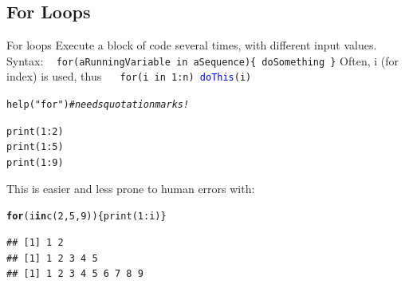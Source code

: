 \documentclass[xcolor=table,       handout,    xcolor=dvipsnames]{beamer}\usepackage[]{graphicx}\usepackage[]{color}
\makeatletter
\newcommand{\hlnum}[1]{\textcolor[rgb]{0,0,0}{#1}}
\newcommand{\hlstr}[1]{\textcolor[rgb]{0.545,0.137,0.137}{#1}}
\newcommand{\hlcom}[1]{\textcolor[rgb]{0,0.392,0}{\textit{#1}}}
\newcommand{\hlopt}[1]{\textcolor[rgb]{0,0,0}{#1}}
\newcommand{\hlstd}[1]{\textcolor[rgb]{0,0,0}{#1}}
\newcommand{\hlkwa}[1]{\textcolor[rgb]{1,0,0}{\textbf{#1}}}
\newcommand{\hlkwd}[1]{\textcolor[rgb]{0,0,1}{#1}}
\newenvironment{kframe}{%
 \def\at@end@of@kframe{}%
 \ifinner\ifhmode%
  \def\at@end@of@kframe{\end{minipage}}%
  \begin{minipage}{\columnwidth}%
 \fi\fi%
 \def\FrameCommand##1{\hskip\@totalleftmargin \hskip-\fboxsep
 \colorbox{shadecolor}{##1}\hskip-\fboxsep
     \hskip-\linewidth \hskip-\@totalleftmargin \hskip\columnwidth}%
 \MakeFramed {\advance\hsize-\width
   \@totalleftmargin\z@ \linewidth\hsize
   \@setminipage}}%
 {\par\unskip\endMakeFramed%
 \at@end@of@kframe}
\newenvironment{knitrout}{}{} %
\newcommand{\rcode}[1]{\texttt{\textcolor{Blue}{#1}}} %
\makeatother
\begin{document}
\subsection{For Loops}

\begin{frame}[fragile]{For loops}
Execute a block of code several times, with different input values.\\
Syntax: ~ \texttt{\alert{for}(aRunningVariable \alert{in} aSequence)\{ doSomething \}}
\pause
Often, i (for index) is used, thus ~~ \texttt{\alert{for}(i \alert{in} 1:n) \rcode{doThis}(i)}
\pause
\begin{knitrout}
\color{fgcolor}\begin{kframe}
\begin{alltt}
\hlkwd{help}\hlstd{(}\hlstr{"for"}\hlstd{)} \hlcom{# needs quotation marks!}
\end{alltt}
\end{kframe}
\end{knitrout}
\pause
\begin{knitrout}
\color{fgcolor}\begin{kframe}
\begin{alltt}
\hlkwd{print}\hlstd{(}\hlnum{1}\hlopt{:}\hlnum{2}\hlstd{)}
\hlkwd{print}\hlstd{(}\hlnum{1}\hlopt{:}\hlnum{5}\hlstd{)}
\hlkwd{print}\hlstd{(}\hlnum{1}\hlopt{:}\hlnum{9}\hlstd{)}
\end{alltt}
\end{kframe}
\end{knitrout}
\pause
This is easier and less prone to human errors with:
\pause
\begin{knitrout}
\color{fgcolor}\begin{kframe}
\begin{alltt}
\hlkwa{for}\hlstd{(i} \hlkwa{in} \hlkwd{c}\hlstd{(}\hlnum{2}\hlstd{,}\hlnum{5}\hlstd{,}\hlnum{9}\hlstd{) ) \{} \hlkwd{print}\hlstd{(}\hlnum{1}\hlopt{:}\hlstd{i) \}}
\end{alltt}
\begin{verbatim}
## [1] 1 2
## [1] 1 2 3 4 5
## [1] 1 2 3 4 5 6 7 8 9
\end{verbatim}
\end{kframe}
\end{knitrout}
\end{frame}
\end{document}
